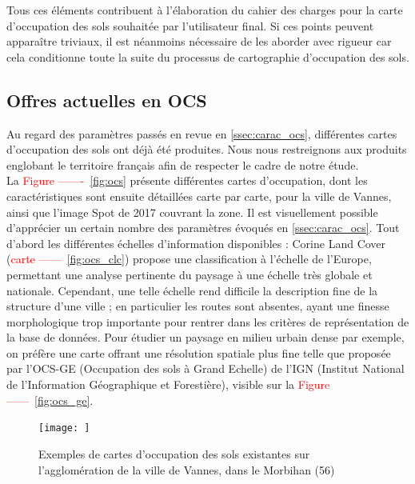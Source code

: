 Tous ces éléments contribuent à l'élaboration du cahier des charges pour la carte d'occupation des sols souhaitée par l'utilisateur final. Si ces points peuvent apparaître triviaux, il est néanmoins nécessaire de les aborder avec rigueur car cela conditionne toute la suite du processus de cartographie d'occupation des sols. 


\subsection{Offres actuelles en OCS}
Au regard des paramètres passés en revue en \ref{ssec:carac_ocs}, différentes cartes d'occupation des sols ont déjà été produites. Nous nous restreignons aux produits englobant le territoire français afin de respecter le cadre de notre étude. \\
La \textcolor{red}{Figure -------~\ref{fig:ocs}} présente différentes cartes d'occupation, dont les caractéristiques sont ensuite détaillées carte par carte, pour la ville de Vannes, ainsi que l'image Spot de 2017 couvrant la zone. Il est visuellement possible d'apprécier un certain nombre des paramètres évoqués en \ref{ssec:carac_ocs}. Tout d'abord les différentes échelles d'information disponibles : Corine Land Cover (\textcolor{red}{carte ------~\ref{fig:ocs_clc}}) propose une classification à l'échelle de l'Europe, permettant une analyse pertinente du paysage à une échelle très globale et nationale. Cependant, une telle échelle rend difficile la description fine de la structure d'une ville ; en particulier les routes sont absentes, ayant une finesse morphologique trop importante pour rentrer dans les critères de représentation de la base de données. Pour étudier un paysage en milieu urbain dense par exemple, on préfère une carte offrant une résolution spatiale plus fine telle que proposée par l'OCS-GE (Occupation des sols à Grand Echelle) de l'IGN (Institut National de l'Information Géographique et Forestière), visible sur la \textcolor{red}{Figure ------~\ref{fig:ocs_ge}}.

\begin{figure}
    \centering
    \texttt{[image: ]}
    \caption{Exemples de cartes d'occupation des sols existantes sur l'agglomération de la ville de Vannes, dans le Morbihan (56)}
    \label{fig:ocs_existantes}
\end{figure}

